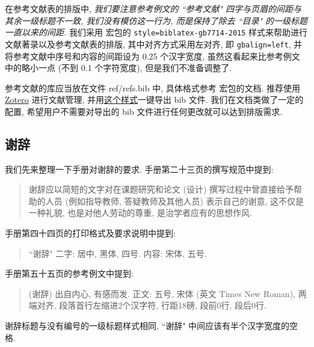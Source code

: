 在参考文献表的排版中, \emph{我们要注意参考例文的 ``参考文献" 四字与页眉的间距与其余一级标题不一致, 我们没有模仿这一行为, 而是保持了除去 ``目录" 的一级标题一直以来的间距.} 我们采用  宏包的 \verb|style=biblatex-gb7714-2015| 样式来帮助进行文献著录以及参考文献表的排版, 其中对齐方式采用左对齐, 即 \verb|gbalign=left|, 并将参考文献中序号和内容的间距设为 0.25 个汉字宽度, 虽然这看起来比参考例文中的略小一点 (不到 0.1 个字符宽度), 但是我们不准备调整了.

参考文献的库应当放在文件 ref/refs.bib 中, 具体格式参考  宏包的文档. 推荐使用 \href{https://www.zotero.org/}{Zotero} 进行文献管理, 并用\href{https://www.zotero.org/styles/chinese-gb7714-2005-numeric}{这个样式}一键导出 bib 文件. 我们在文档类做了一定的配置, 希望用户不需要对导出的 bib 文件进行任何更改就可以达到排版需求.

\subsection{谢辞}

我们先来整理一下手册对谢辞的要求. 手册第二十三页的撰写规范中提到:
\begin{quote}
  谢辞应以简短的文字对在课题研究和论文 (设计) 撰写过程中曾直接给予帮助的人员 (例如指导教师, 答疑教师及其他人员) 表示自己的谢意, 这不仅是一种礼貌, 也是对他人劳动的尊重, 是治学者应有的思想作风.
\end{quote}
手册第四十四页的打印格式及要求说明中提到:
\begin{quote}
  ``谢辞" 二字: 居中, 黑体, 四号.
  内容: 宋体, 五号.
\end{quote}
手册第五十五页的参考例文中提到:
\begin{quote}
  (谢辞) 出自内心, 有感而发. 正文: 五号, 宋体 (英文 Times New Roman), 两端对齐, 段落首行左缩进2个汉字符, 行距18磅, 段前0行, 段后0行.
\end{quote}

谢辞标题与没有编号的一级标题样式相同, ``谢辞" 中间应该有半个汉字宽度的空格.
